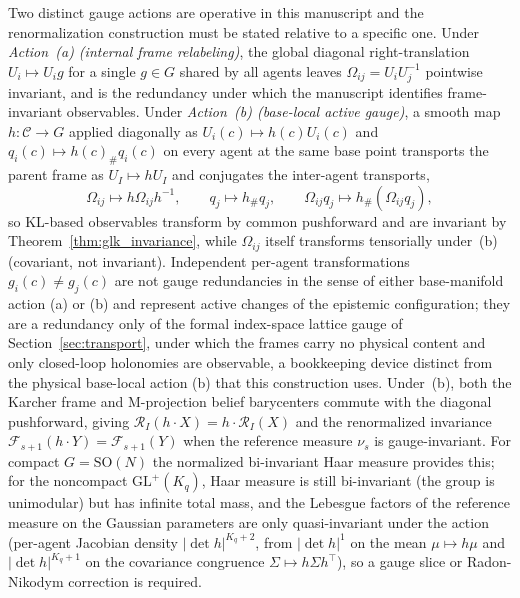 \documentclass[11pt]{article}
\begin{document}
Two distinct gauge actions are operative in this manuscript and the renormalization construction must be stated relative to a specific one. Under \emph{Action~(a) (internal frame relabeling)}, the global diagonal right-translation $U_i \mapsto U_i g$ for a single $g \in G$ shared by all agents leaves $\Omega_{ij} = U_i U_j^{-1}$ pointwise invariant, and is the redundancy under which the manuscript identifies frame-invariant observables. Under \emph{Action~(b) (base-local active gauge)}, a smooth map $h : \mathcal{C} \to G$ applied diagonally as $U_i(c) \mapsto h(c) U_i(c)$ and $q_i(c) \mapsto h(c)_\# q_i(c)$ on every agent at the same base point transports the parent frame as $U_I \mapsto h U_I$ and conjugates the inter-agent transports,
\begin{equation}
\Omega_{ij} \mapsto h \Omega_{ij} h^{-1}, \qquad q_j \mapsto h_\# q_j, \qquad \Omega_{ij} q_j \mapsto h_\#(\Omega_{ij} q_j),
\end{equation}
so KL-based observables transform by common pushforward and are invariant by Theorem~\ref{thm:glk_invariance}, while $\Omega_{ij}$ itself transforms tensorially under~(b) (covariant, not invariant). Independent per-agent transformations $g_i(c) \neq g_j(c)$ are not gauge redundancies in the sense of either base-manifold action (a) or (b) and represent active changes of the epistemic configuration; they are a redundancy only of the formal index-space lattice gauge of Section~\ref{sec:transport}, under which the frames carry no physical content and only closed-loop holonomies are observable, a bookkeeping device distinct from the physical base-local action (b) that this construction uses. Under~(b), both the Karcher frame and M-projection belief barycenters commute with the diagonal pushforward, giving $\mathcal{R}_I(h \cdot X) = h \cdot \mathcal{R}_I(X)$ and the renormalized invariance $\mathcal{F}_{s+1}(h \cdot Y) = \mathcal{F}_{s+1}(Y)$ when the reference measure $\nu_s$ is gauge-invariant. For compact $G = \mathrm{SO}(N)$ the normalized bi-invariant Haar measure provides this; for the noncompact $\mathrm{GL}^+(K_q)$, Haar measure is still bi-invariant (the group is unimodular) but has infinite total mass, and the Lebesgue factors of the reference measure on the Gaussian parameters are only quasi-invariant under the action (per-agent Jacobian density $|\det h|^{K_q+2}$, from $|\det h|^{1}$ on the mean $\mu \mapsto h\mu$ and $|\det h|^{K_q+1}$ on the covariance congruence $\Sigma \mapsto h\Sigma h^\top$), so a gauge slice or Radon-Nikodym correction is required.
\end{document}
